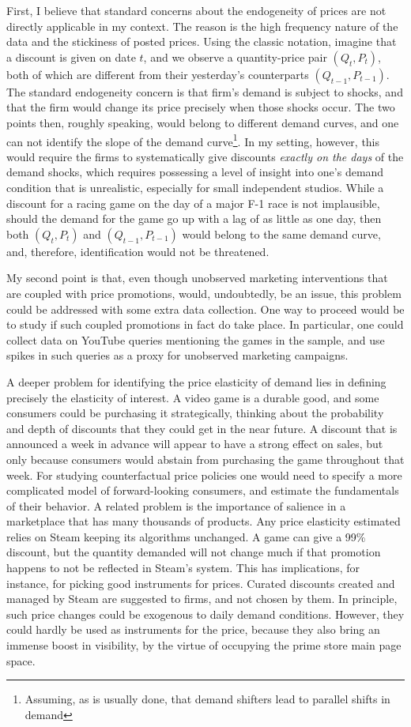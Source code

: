 \documentclass[12pt,pagebackref]{article}
\begin{document}
First, I believe that standard concerns about the endogeneity of prices
are not directly applicable in my context. The reason is the high
frequency nature of the data and the stickiness of posted prices. Using
the classic notation, imagine that a discount is given on date \(t\),
and we observe a quantity-price pair \((Q_t, P_t)\), both of which are
different from their yesterday's counterparts \((Q_{t-1}, P_{t-1})\).
The standard endogeneity concern is that firm's demand is subject to
shocks, and that the firm would change its price precisely when those
shocks occur. The two points then, roughly speaking, would belong to
different demand curves, and one can not identify the slope of the
demand
curve\footnote{Assuming, as is usually done, that demand shifters lead to parallel shifts in demand}.
In my setting, however, this would require the firms to systematically
give discounts \emph{exactly on the days} of the demand shocks, which
requires possessing a level of insight into one's demand condition that
is unrealistic, especially for small independent studios. While a
discount for a racing game on the day of a major F-1 race is not
implausible, should the demand for the game go up with a lag of as
little as one day, then both \((Q_t, P_t)\) and \((Q_{t-1}, P_{t-1})\)
would belong to the same demand curve, and, therefore, identification
would not be threatened.

My second point is that, even though unobserved marketing interventions
that are coupled with price promotions, would, undoubtedly, be an issue,
this problem could be addressed with some extra data collection. One way
to proceed would be to study if such coupled promotions in fact do take
place. In particular, one could collect data on YouTube queries
mentioning the games in the sample, and use spikes in such queries as a
proxy for unobserved marketing campaigns.

A deeper problem for identifying the price elasticity of demand lies in
defining precisely the elasticity of interest. A video game is a durable
good, and some consumers could be purchasing it strategically, thinking
about the probability and depth of discounts that they could get in the
near future. A discount that is announced a week in advance will appear
to have a strong effect on sales, but only because consumers would
abstain from purchasing the game throughout that week. For studying
counterfactual price policies one would need to specify a more
complicated model of forward-looking consumers, and estimate the
fundamentals of their behavior. A related problem is the importance of
salience in a marketplace that has many thousands of products. Any price
elasticity estimated relies on Steam keeping its algorithms unchanged. A
game can give a 99\% discount, but the quantity demanded will not change
much if that promotion happens to not be reflected in Steam's system.
This has implications, for instance, for picking good instruments for
prices. Curated discounts created and managed by Steam are suggested to
firms, and not chosen by them. In principle, such price changes could be
exogenous to daily demand conditions. However, they could hardly be used
as instruments for the price, because they also bring an immense boost
in visibility, by the virtue of occupying the prime store main page
space.
\end{document}

